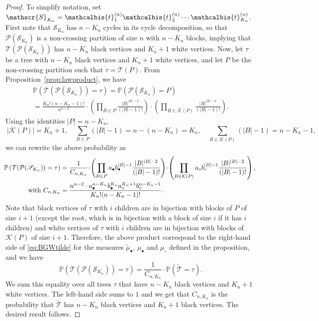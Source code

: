 \documentclass[AHL,XML,longabstracts,Unicode]{cedram}
\renewcommand{\P}{\mathbb{P}}
\def\PPP{\mathcal P}
\def\tmub{\widetilde{\mu}_{\bullet}}
\def\ab{a_{\bullet}}
\def\ac{a_{\circ}}
\def\bb{b_{\bullet}}
\def\bc{b_{\circ}}
\def\mub{\mu_{\bullet}}
\def\muc{\mu_{\circ}}
\def\tb{\mathcalbis{t}}
\renewcommand\Pr[1]{\mathbb{P}\left(#1\right)}
\begin{document}
\begin{proof}
To simplify notation, set $\mathscr{S}_{K_n}= \tb_{1}^{(n)} \tb_{2}^{(n)} \cdots \tb_{K_{n}}^{(n)}$.
First note that $\mathscr{S}_{K_n}$ has $n-K_{n}$ cycles in its cycle decomposition, so that $ \PPP( \mathscr{S}_{K_n})$ is a non-crossing partition of size $n$ with $n-K_{n}$ blocks, implying that
$ \mathcal{T}( \PPP( \mathscr{S}_{K_n}))$ has $n-K_{n}$ black vertices and $K_{n}+1$ white vertices.
Now, let $\tau$ be a tree with $n-K_{n}$ black vertices and $K_{n}+1$ white vertices,
and let $P$ be the non-crossing partition such that $\tau= \mathcal{T}(P)$.
From Proposition~\ref{prop:lawproduct}, we have
\begin{multline*}
\Pr{\mathcal{T}( \PPP(\mathscr{S}_{K_n}))=\tau}= \Pr{ \PPP(\mathscr{S}_{K_n})= P} \\
=  \frac{K_{n}! (n-K_{n}-1)!}{n^{n-2}}  \cdot  \left( \prod_{B \in P} \frac{|B|^{|B|-2}}{(|B|-1)!} \right) \cdot \left(  \prod_{B \in  \mathcal{K}(P)} \frac{|B|^{|B|-2}}{(|B|-1)!} \right).
\end{multline*}
Using the identities $|P| =n-K_n$,
\[ \ |\mathcal K(P)|=K_n+1, \quad  \sum_{B \in P} (|B|-1)=n-(n-K_{n})=K_{n},  \quad
\sum_{B \in  \mathcal{K}(P)} (|B|-1)=n-K_{n}-1,\]
we can rewrite the above probability as
\begin{align*}
  \hspace{-1mm}\Pr{\mathcal{T}( \PPP(\mathscr{S}_{K_n}))=\tau}
&= \frac{1}{C_{n,K_n}} \!\cdot\! \left( \prod_{B \in P} \ab \bb^{|B|-1}\frac{|B|^{|B|-2}}{(|B|-1)!} \right)\! \cdot\! \left(  \prod_{B \in  \mathcal{K}(P)} \ac \bc^{|B|-1} \frac{|B|^{|B|-2}}{(|B|-1)!} \right),\\
\text{with }
C_{n,K_n} & =\frac{n^{n-2} \cdot \ab^{n-K_{n}} \bb^{K_{n}} \ac^{K_{n}+1} \bc^{n-K_{n}-1}}{K_{n}! (n-K_{n}-1)!}.
\end{align*}
 Note that black vertices of $\tau$ with $i$ children are in bijection with blocks of $P$ of size $i+1$ (except the root, which is in bijection with a block of size $i$ if it has $i$ children) and white vertices of $\tau$ with $i$ children are in bijection with blocks of $ \mathcal{K}(P)$ of size $i+1$. Therefore, the above product correspond to the right-hand side
 of \eqref{eq:BGWtilde} for the measures $\tmub$, $\mub$ and $\muc$ defined in the proposition,
 and we have
 \[\Pr{\mathcal{T}( \PPP(\mathscr{S}_{K_n}))=\tau}=\frac{1}{C_{n,K_n}} \cdot \P( \tilde{ \mathscr{T} }=\tau).\]
 We sum this equality over all trees $\tau$  that have $n-K_{n}$ black vertices and $K_{n}+1$ white vertices.
 The left-hand side sums to $1$ and we get that $C_{n,K_n}$
 is the probability that $\tilde{ \mathscr{T} }$
 has $n-K_n$ black vertices and $K_n+1$ black vertices.
 The desired result follows.
\end{proof}
\end{document}
